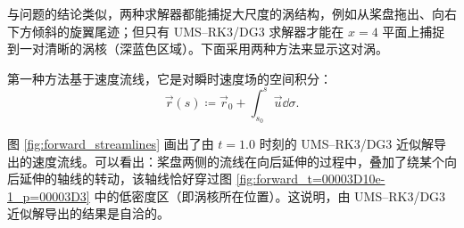 与问题的结论类似，两种求解器都能捕捉大尺度的涡结构，例如从桨盘拖出、向右下方倾斜的旋翼尾迹；但只有
UMS–RK3/DG3 求解器才能在 $x=4$ 平面上捕捉到一对清晰的涡核（深蓝色区域）。下面采用两种方法来显示这对涡。

\newpage{}

第一种方法基于速度流线，它是对瞬时速度场的空间积分：
\begin{equation}
\vec{r}(s)\coloneqq\vec{r}_{0}+\int_{s_{0}}^{s}\vec{u}\dd{\sigma}.
\end{equation}

图 \ref{fig:forward_streamlines} 画出了由 $t=1.0$ 时刻的 UMS–RK3/DG3 近似解导出的速度流线。可以看出：桨盘两侧的流线在向后延伸的过程中，叠加了绕某个向后延伸的轴线的转动，该轴线恰好穿过图
\ref{fig:forward_t=00003D10e-1_p=00003D3} 中的低密度区（即涡核所在位置）。这说明，由 UMS–RK3/DG3
近似解导出的结果是自洽的。

